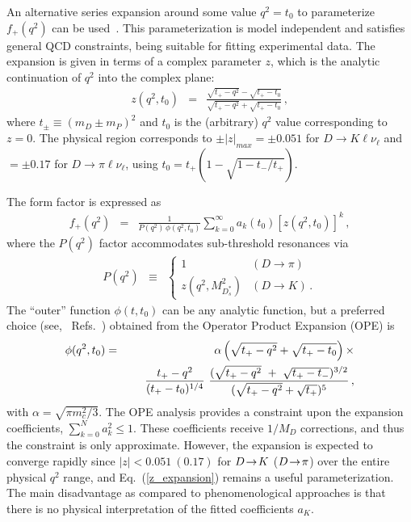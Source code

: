 
An alternative series expansion around some value $q^2=t_0$ to parameterize 
$f^{}_+(q^2)$ can be used~\cite{Boyd:1994tt,Boyd:1997qw,Arnesen:2005ez,Becher:2005bg}. This parameterization is model 
independent and satisfies general QCD constraints, being suitable for fitting experimental data.
The expansion is given in terms of a complex parameter $z$,
which is the analytic continuation of $q^2$ into the complex plane:
\begin{eqnarray}
z(q^2,t_0) & = & \frac{\sqrt{t_+ - q^2} - \sqrt{t_+ - t_0}}{\sqrt{t_+ - q^2}
	  + \sqrt{t_+ - t_0}}\,, 
\end{eqnarray}
where $t_\pm \equiv (m_D \pm m_P)^2$ and $t_0$ is the (arbitrary) $q^2$ 
value corresponding to $z=0$. The physical region corresponds to $\pm|z|_{max} = \pm 0.051$ 
for $D\to K \ell \nu_\ell$ and $= \pm 0.17$ for  $D\to \pi \ell \nu_\ell$, 
using $t_{0}= t_{+} (1-\sqrt{1-t_{-}/t_{+}})$.  

The form factor is expressed as
\begin{eqnarray}
f_+(q^2) & = & \frac{1}{P(q^2)\,\phi(q^2,t_0)}\sum_{k=0}^\infty
a_k(t_0)[z(q^2,t_0)]^k\,,
\label{z_expansion}
\end{eqnarray}
where the $P(q^2)$ factor accommodates sub-threshold resonances via
\begin{eqnarray}
P(q^2) & \equiv & 
\begin{cases} 
1 & (D\to \pi) \\
z(q^2,M^2_{D^*_s}) & (D\to K)\,. 
\end{cases}
\end{eqnarray}
The ``outer'' function $\phi(t,t_0)$ can be any analytic function,
but a preferred choice (see, \eg\
Refs.~\cite{Boyd:1994tt,Boyd:1997qw,Bourrely:1980gp}) obtained
from the Operator Product Expansion (OPE) is
\begin{eqnarray}
\phi(q^2,t_0) & =  & \alpha 
\left(\sqrt{t_+ - q^2}+\sqrt{t_+ - t_0}\right) \times  \nonumber \\
 & & \hskip0.20in \frac{t_+ - q^2}{(t_+ - t_0)^{1/4}}\  
\frac{(\sqrt{t_+ - q^2}\ +\ \sqrt{t_+ - t_-})^{3/2}}
     {(\sqrt{t_+ - q^2}+\sqrt{t_+})^5}\,,
\label{eqn:outer}
\end{eqnarray}
with $\alpha = \sqrt{\pi m_c^2/3}$.
The OPE analysis provides a constraint upon the 
expansion coefficients, $\sum_{k=0}^{N}a_k^2 \leq 1$.
These coefficients receive $1/M_D$ corrections, and thus
the constraint is only approximate. However, the
expansion is expected to converge rapidly since 
$|z|<0.051\ (0.17)$ for $D\!\rightarrow\! K$ ($D\!\rightarrow\!\pi$) over 
the entire physical $q^2$ range, and Eq.~(\ref{z_expansion}) 
remains a useful parameterization. The main disadvantage as compared to 
phenomenological approaches is that there is no physical interpretation 
of the fitted coefficients $a_K$.

